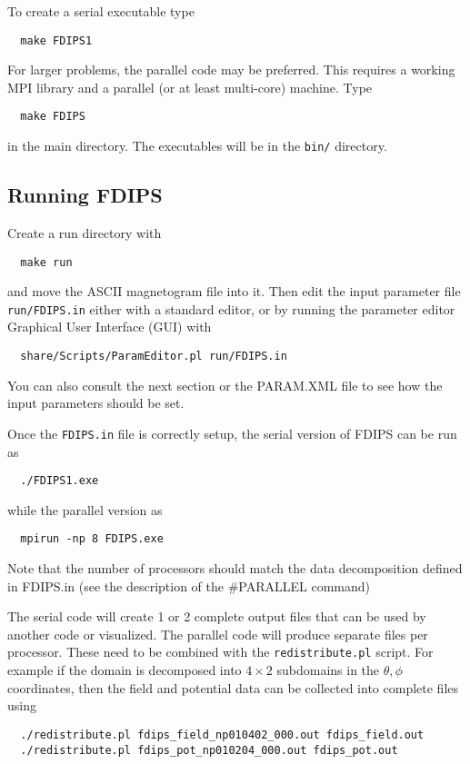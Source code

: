 \documentclass[12pt]{article}
\begin{document}
To create a serial executable type
\begin{verbatim}
  make FDIPS1
\end{verbatim}
For larger problems, the parallel code may be preferred. This requires
a working MPI library and a parallel (or at least multi-core) machine. Type
\begin{verbatim}
  make FDIPS
\end{verbatim}
in the main directory. The executables will be in the {\tt bin/} directory.

\subsection{Running FDIPS}

Create a run directory with
\begin{verbatim}
  make run
\end{verbatim}
and move the ASCII magnetogram file into it. Then edit the input parameter
file {\tt run/FDIPS.in} either with a standard editor, or by running the
parameter editor Graphical User Interface (GUI) with
\begin{verbatim}
  share/Scripts/ParamEditor.pl run/FDIPS.in
\end{verbatim}
You can also consult the next section or the PARAM.XML file to see
how the input parameters should be set.

Once the {\tt FDIPS.in} file is correctly setup, the serial version of FDIPS
can be run as
\begin{verbatim}
  ./FDIPS1.exe
\end{verbatim}
while the parallel version as
\begin{verbatim}
  mpirun -np 8 FDIPS.exe
\end{verbatim}
Note that the number of processors should match the data decomposition defined
in FDIPS.in (see the description of the \#PARALLEL command)

The serial code will create 1 or 2 complete output files that can be used
by another code or visualized. The parallel code will produce separate
files per processor. These need to be combined with the {\tt redistribute.pl}
script. For example if the domain is decomposed into $4 \times 2$ 
subdomains
in the $\theta, \phi$ coordinates, then the field and potential data
can be collected into complete files using
\begin{verbatim}
  ./redistribute.pl fdips_field_np010402_000.out fdips_field.out
  ./redistribute.pl fdips_pot_np010204_000.out fdips_pot.out
\end{verbatim}


\end{document}
